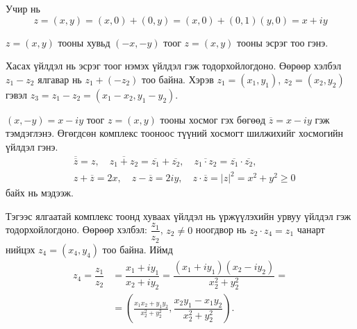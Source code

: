 Учир нь
$$z=(x,y)=(x,0)+(0,y)=(x,0)+(0,1)(y,0)=x+iy$$
\begin{dfn} $z=(x,y)$ тооны хувьд $(-x,-y)$ тоог $z=(x,y)$ тооны эсрэг тоо гэнэ.

Хасах үйлдэл нь эсрэг тоог нэмэх үйлдэл гэж тодорхойлогдоно. Өөрөөр хэлбэл $z_1-z_2$ ялгавар  нь $z_1+(-z_2)$  тоо байна. Хэрэв $z_1=(x_1,y_1)$, $z_2=(x_2,y_2)$ гэвэл $z_3=z_1-z_2=(x_1-x_2, y_1-y_2).$   
\end{dfn}
\begin{dfn}
    $(x,-y)=x-iy$ тоог $z=(x,y)$ тооны хосмог гэх бөгөөд $\overline{z}=x-iy$ гэж тэмдэглэнэ. Өгөгдсөн комплекс тооноос түүний хосмогт шилжихийг хосмогийн үйлдэл гэнэ. 
\begin{align*}
&\overline{\overline{z}}=z, \quad \overline{z_1+z_2}=\overline{z_1}+\overline{z_2},  \quad \overline{z_1\cdot z_2}=\overline{z_1}\cdot \overline{z_2}, \\ &z+\overline{z}=2x, \quad z-\overline{z}=2iy,  \quad z\cdot \overline{z}=|z|^2=x^2+y^2\geq 0 
\end{align*} байх нь мэдээж.
\end{dfn}
\begin{dfn}
    Тэгээс ялгаатай комплекс тоонд хуваах үйлдэл нь үржүүлэхийн урвуу үйлдэл гэж тодорхойлогдоно. Өөрөөр хэлбэл: $\dfrac{z_1}{z_2}$, $z_2\neq 0$ ноогдвор нь  $z_2\cdot z_4=z_1$ чанарт нийцэх
$z_4=(x_4,y_4)$ тоо байна. Иймд
\begin{align*}
z_4=\dfrac{z_1}{z_2}&=\dfrac{x_1+iy_1}{x_2+iy_2}=\dfrac{(x_1+iy_1)(x_2-iy_2)}{x_2^2+y_2^2} =\\
&=\left(\frac{x_1x_2+y_1y_2}{x_2^2+y^2_2}, \dfrac{x_2y_1-x_1y_2}{x_2^2+y_2^2}\right).
\end{align*}
\end{dfn}

